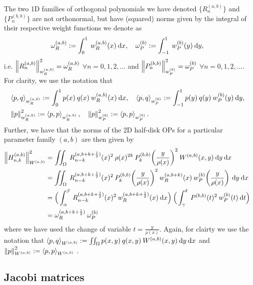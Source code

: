 \documentclass[11pt, oneside]{article}   	%
\newcommand{\half}{\frac{1}{2}}
\newcommand{\hdop}{H}
\newcommand{\hdopnkab}{\hdop_{n,k}^{(a,b)}}
\newcommand{\Wab}{{W^{(a,b)}}}
\newcommand{\genjac}{R}
\newcommand{\genjacnmk}{\genjac_{n-k}}
\newcommand{\genjacw}{w_\genjac}
\newcommand{\normgenjac}{\omega_\genjac}
\newcommand{\normjac}{\omega_P}
\begin{document}
The two 1D families of orthogonal polynomials we have denoted $\{\genjac_{n}^{(a,b)}\}$ and $\{P_n^{(b,b)}\}$ are not orthonormal, but have (squared) norms given by the integral of their respective weight functions we denote as
\begin{align*}
	\normgenjac^{(a,b)} := \int_0^1 \: \genjacw^{(a,b)}(x) \: \D x, \quad \normjac^{(b)} := \int_{-1}^1 \: w_P^{(b)}(y) \: \D y,
\end{align*}
i.e. $\norm{\genjac_{n}^{(a,b)}}_{\genjacw^{(a,b)}}^2 = \normgenjac^{(a,b)}$ $\forall n = 0,1,2,\dots$ and $\norm{P_{n}^{(b,b)}}_{w_P^{(b)}}^2 = \normjac^{(b)}$ $\forall n = 0,1,2,\dots$. For clarity, we use the notation that 
\begin{align*}
	&\ip<p, q>_{\genjacw^{(a,b)}} := \int_0^1 p(x) \: q(x) \: \genjacw^{(a,b)}(x) \: \D x, \quad
		\ip<p, q>_{w_P^{(b)}} := \int_{-1}^1 p(y) \: q(y) \: w_P^{(b)}(y)\: \D y, \\
	&\norm{p}_{\genjacw^{(a,b)}}^2 := \ip<p, p>_{\genjacw^{(a,b)}}, \quad
		\norm{p}_{w_P^{(b)}}^2 := \ip<p, p>_{w_P^{(b)}}.
\end{align*}
Further, we have that the norms of the 2D half-disk OPs for a particular parameter family $(a,b)$ are then given by
\begin{align}
	\norm{\hdopnkab}_\Wab^2 &=  \iint_\Omega \: {\genjacnmk^{(a,b+k+\half)}}(x)^2 \: \rho(x)^{2k} \: {P_k^{(b,b)}\fpr(\frac{y}{\rho(x)})^2} \: \Wab(x,y) \: \D y \: \D x \nonumber \\
	&= \iint_\Omega \: {\genjacnmk^{(a,b+k+\half)}}(x)^2 \: {P_k^{(b,b)}\fpr(\frac{y}{\rho(x)})^2} \: \genjacw^{(a,b+k)}(x) \: w_P^{(b)}\fpr(\frac{y}{\rho(x)}) \: \D y \: \D x \nonumber \\
	&= \Big( \int_\alpha^\beta \: {\genjacnmk^{(a,b+k+\half)}}(x)^2 \: \genjacw^{(a,b+k+\half)}(x) \: \D x \Big) \: \Big( \int_\gamma^\delta \: {P^{(b,b)}}(t)^2 \: w_P^{(b)}(t) \: \D t \Big) \nonumber \\
	&= \normgenjac^{(a,b+k+\half)} \: \normjac^{(b)} \label{eqn:normhdop}
\end{align}
where we have used the change of variable $t = \frac{y}{\rho(x)}$. Again, for clairty we use the notation that $\ip<p, q>_{\Wab} := \iint_\Omega p(x,y) \: q(x,y) \: \Wab(x,y) \: \D y \: \D x$ and $\norm{p}_{\Wab}^2 := \ip<p, p>_{\Wab}$ .


\subsection{Jacobi matrices}
\end{document}
